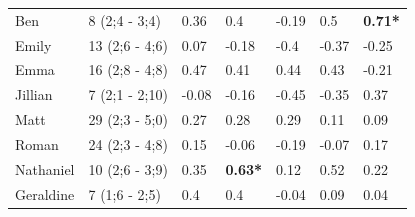 \begin{table}[]
\begin{tabular}{ll|lllll}
Ben&8 (2;4 - 3;4)&0.36&0.4&-0.19&0.5&\textbf{0.71*}\\
Emily&13 (2;6 - 4;6)&0.07&-0.18&-0.4&-0.37&-0.25\\
Emma&16 (2;8 - 4;8)&0.47&0.41&0.44&0.43&-0.21\\
Jillian&7 (2;1 - 2;10)&-0.08&-0.16&-0.45&-0.35&0.37\\
Matt&29 (2;3 - 5;0)&0.27&0.28&0.29&0.11&0.09\\
Roman&24 (2;3 - 4;8)&0.15&-0.06&-0.19&-0.07&0.17\\
Nathaniel&10 (2;6 - 3;9)&0.35&\textbf{0.63*}&0.12&0.52&0.22\\
Geraldine&7 (1;6 - 2;5)&0.4&0.4&-0.04&0.09&0.04\\
\bottomrule
\end{tabular}
\end{table}
\FloatBarrier


